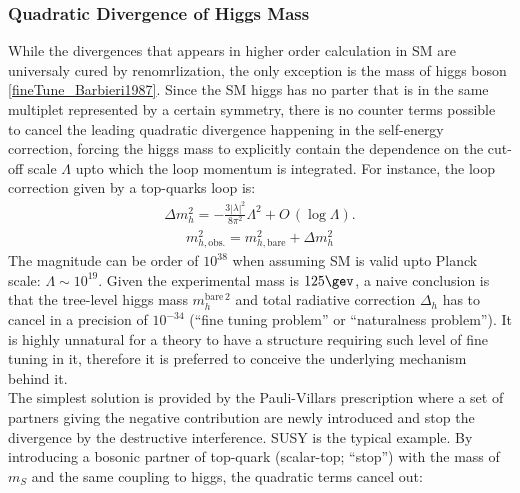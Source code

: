 \subsubsection{Quadratic Divergence of Higgs Mass}
While the divergences that appears in higher order calculation in SM are universaly cured by renomrlization, the only exception is the mass of higgs boson \ref{fineTune_Barbieri1987}. Since the SM higgs has no parter that is in the same multiplet represented by a certain symmetry, there is no counter terms possible to cancel the leading quadratic divergence happening in the self-energy correction, forcing the higgs mass to explicitly contain the dependence on the cut-off scale $\Lambda$ upto which the loop momentum is integrated.
For instance, the loop correction given by a top-quarks loop is:
\begin{align}
\Delta m_h ^2 = - \frac{3|\lambda|^2}{8\pi^2} \Lambda^2 + O\,(\log\Lambda). 
\label{eq::naturalness1}
\end{align}
%
\begin{align}
m^2_{h,\mathrm{obs.}} = m^2_{h,\mathrm{bare}} + \Delta m_h ^2
\label{eq::naturalnessBare}
\end{align}
The magnitude can be order of $10^{38}$ when assuming SM is valid upto Planck scale: $\Lambda \sim 10^{19}$. 
Given the experimental mass is $125\gev$, a naive conclusion is that the tree-level higgs mass $m_h^{\mathrm{bare} \, 2}$ and total radiative correction $\Delta_h$ has to cancel in a precision of $10^{-34}$ (``fine tuning problem'' or ``naturalness problem'').
It is highly unnatural for a theory to have a structure requiring such level of fine tuning in it, therefore it is preferred to conceive the underlying mechanism behind it.  \\
The simplest solution is provided by the Pauli-Villars prescription where a set of partners giving the negative contribution are newly introduced and stop the divergence by the destructive interference. SUSY is the typical example. By introducing a bosonic partner of top-quark (scalar-top; ``stop'') with the mass of $m_S$ and the same coupling to higgs, the quadratic terms cancel out:
